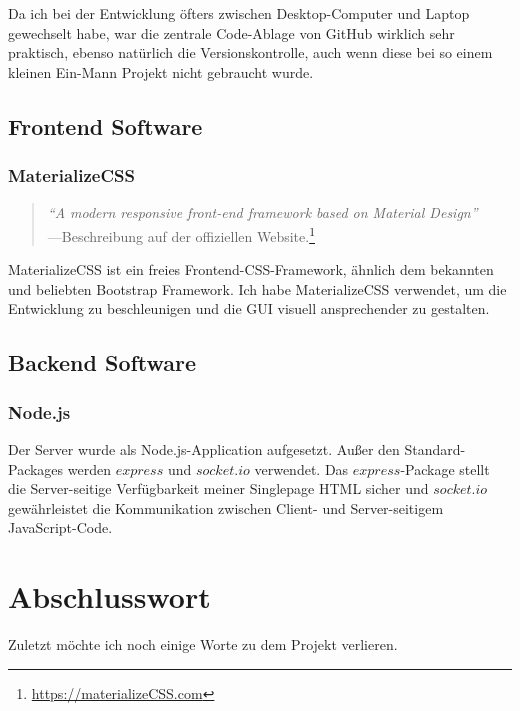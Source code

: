 \documentclass[12pt]{scrartcl}
\begin{document}
			Da ich bei der Entwicklung öfters zwischen Desktop-Computer und Laptop gewechselt habe, war die zentrale Code-Ablage von GitHub wirklich sehr praktisch, ebenso natürlich die Versionskontrolle, auch wenn diese bei so einem kleinen Ein-Mann Projekt nicht gebraucht wurde.
		
	\subsection{Frontend Software}
	
		\subsubsection{MaterializeCSS}
		
			\begin{quote}
				\textit{"`A modern responsive front-end framework based on Material Design"'} \\
				\null\hfill ---Beschreibung auf der offiziellen Website.\footnote{\url{https://materializeCSS.com}}
			\end{quote}
		
			MaterializeCSS ist ein freies Frontend-CSS-Framework, ähnlich dem bekannten und beliebten Bootstrap Framework. Ich habe MaterializeCSS verwendet, um die Entwicklung zu beschleunigen und die GUI visuell ansprechender zu gestalten.
		
	\subsection{Backend Software}
	
		\subsubsection{Node.js}
		
			Der Server wurde als Node.js-Application aufgesetzt. Außer den Standard-Packages werden $express$ und $socket.io$ verwendet. Das $express$-Package stellt die Server-seitige Verfügbarkeit meiner Singlepage HTML sicher und $socket.io$ gewährleistet die Kommunikation zwischen Client- und Server-seitigem JavaScript-Code.

\section{Abschlusswort}

	Zuletzt möchte ich noch einige Worte zu dem Projekt verlieren.\\
	
\end{document}
